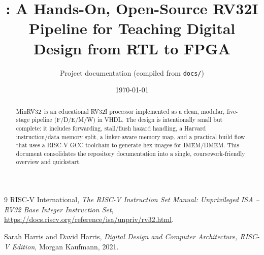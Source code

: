 \documentclass[11pt]{article}
\title{\ProjectName: A Hands-On, Open-Source RV32I Pipeline for Teaching Digital Design from RTL to FPGA}
\author{Project documentation (compiled from \texttt{docs/})}
\date{\today}
\newcommand{\ProjectName}{MinRV32}
\begin{document}
\sloppy
\maketitle

\begin{abstract}
\ProjectName\ is an educational RV32I processor implemented as a clean, modular,
five-stage pipeline (F/D/E/M/W) in VHDL. The design is intentionally small but
complete: it includes forwarding, stall/flush hazard handling, a Harvard
instruction/data memory split, a linker-aware memory map, and a practical build
flow that uses a RISC-V GCC toolchain to generate hex images for IMEM/DMEM.
This document consolidates the repository documentation into a single,
coursework-friendly overview and quickstart.
\end{abstract}

\tableofcontents
\newpage


\clearpage

\clearpage

\clearpage

\clearpage

\clearpage

\clearpage

\clearpage

\clearpage

\clearpage

\begin{thebibliography}{9}
RISC-V International,
\emph{The RISC-V Instruction Set Manual: Unprivileged ISA -- RV32 Base Integer Instruction Set},
\url{https://docs.riscv.org/reference/isa/unpriv/rv32.html}.

Sarah Harris and David Harris,
\emph{Digital Design and Computer Architecture, RISC-V Edition},
Morgan Kaufmann, 2021.
\end{thebibliography}
\end{document}
